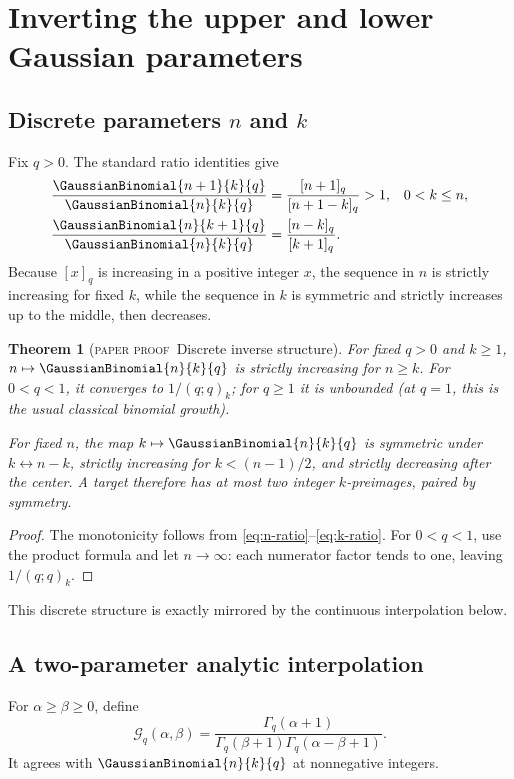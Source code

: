 \documentclass[11pt,oneside]{article}
\newtheorem{theorem}{Theorem}[section]
\theoremstyle{definition}
\theoremstyle{remark}
\theoremstyle{plain}
\theoremstyle{definition}
\theoremstyle{remark}
\newcommand{\statusproved}{\textcolor{provedgreen}{\textsc{paper proof}}}
\numberwithin{equation}{section}
\numberwithin{figure}{section}
\numberwithin{table}{section}
\let\reporttopsection\section
\let\reportsubsection\subsection
\let\reportsubsubsection\subsubsection
\let\chapter\reporttopsection
\let\section\reportsubsection
\let\subsection\reportsubsubsection
\begin{document}
\chapter{Inverting the upper and lower Gaussian parameters}

\section{Discrete parameters \texorpdfstring{\(n\) and \(k\)}{n and k}}
Fix \(q>0\).  The standard ratio identities give
\begin{align}
 \frac{\GaussianBinomial{n+1}{k}{q}}{\GaussianBinomial{n}{k}{q}}
 &=\frac{[n+1]_q}{[n+1-k]_q}>1,
 &&0<k\le n,\label{eq:n-ratio}\\
 \frac{\GaussianBinomial{n}{k+1}{q}}{\GaussianBinomial{n}{k}{q}}
 &=\frac{[n-k]_q}{[k+1]_q}.
 \label{eq:k-ratio}
\end{align}
Because \([x]_q\) is increasing in a positive integer \(x\), the sequence in
\(n\) is strictly increasing for fixed \(k\), while the sequence in \(k\) is
symmetric and strictly increases up to the middle, then decreases.

\begin{theorem}[\statusproved\ Discrete inverse structure]
For fixed \(q>0\) and \(k\ge1\), \(n\mapsto\GaussianBinomial{n}{k}{q}\) is strictly increasing
for \(n\ge k\).  For \(0<q<1\), it converges to \(1/(q;q)_k\); for \(q\ge1\)
it is unbounded (at \(q=1\), this is the usual classical binomial growth).

For fixed \(n\), the map \(k\mapsto\GaussianBinomial{n}{k}{q}\) is symmetric under
\(k\leftrightarrow n-k\), strictly increasing for \(k<(n-1)/2\), and strictly
decreasing after the center.  A target therefore has at most two integer
\(k\)-preimages, paired by symmetry.
\end{theorem}
\begin{proof}
The monotonicity follows from \eqref{eq:n-ratio}--\eqref{eq:k-ratio}.  For
\(0<q<1\), use the product formula and let \(n\to\infty\): each numerator factor
tends to one, leaving \(1/(q;q)_k\).
\end{proof}

This discrete structure is exactly mirrored by the continuous interpolation
below.

\section{A two-parameter analytic interpolation}
For \(\alpha\ge\beta\ge0\), define
\begin{equation}
 \mathcal G_q(\alpha,\beta)
 =\frac{\Gamma_q(\alpha+1)}
 {\Gamma_q(\beta+1)\Gamma_q(\alpha-\beta+1)}.
 \label{eq:generalized-gaussian}
\end{equation}
It agrees with \(\GaussianBinomial{n}{k}{q}\) at nonnegative integers.
\end{document}
